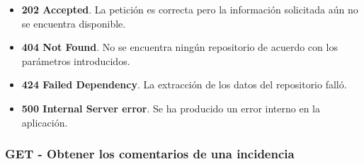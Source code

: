 \begin{itemize}
\begin{itemize}
            \item[] \textbf{202 Accepted}. La petición es correcta pero la información solicitada aún no se encuentra disponible.
            \item[] \textbf{404 Not Found}. No se encuentra ningún repositorio de acuerdo con los parámetros introducidos.
            \item[] \textbf{424 Failed Dependency}. La extracción de los datos del repositorio falló.
            \item[] \textbf{500 Internal Server error}. Se ha producido un error interno en la aplicación.
        \end{itemize}
\end{itemize}

\subsubsection{GET - Obtener los comentarios de una incidencia}


